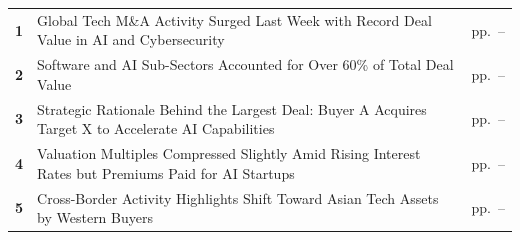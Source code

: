 \documentclass[10pt,a4paper]{article}
\begin{document}
\begin{tabularx}{\linewidth}{p{8mm}Yp{29mm}}
\textcolor{BOBlue}{\bfseries 1} & Global Tech M\&A Activity Surged Last Week with Record Deal Value in AI and Cybersecurity & {\color{BOMuted}pp.~\pageref{chap:1}--\pageref{chap:1:end}} \\[3pt]
\textcolor{BOBlue}{\bfseries 2} & Software and AI Sub-Sectors Accounted for Over 60\% of Total Deal Value & {\color{BOMuted}pp.~\pageref{chap:2}--\pageref{chap:2:end}} \\[3pt]
\textcolor{BOBlue}{\bfseries 3} & Strategic Rationale Behind the Largest Deal: Buyer A Acquires Target X to Accelerate AI Capabilities & {\color{BOMuted}pp.~\pageref{chap:3}--\pageref{chap:3:end}} \\[3pt]
\textcolor{BOBlue}{\bfseries 4} & Valuation Multiples Compressed Slightly Amid Rising Interest Rates but Premiums Paid for AI Startups & {\color{BOMuted}pp.~\pageref{chap:4}--\pageref{chap:4:end}} \\[3pt]
\textcolor{BOBlue}{\bfseries 5} & Cross-Border Activity Highlights Shift Toward Asian Tech Assets by Western Buyers & {\color{BOMuted}pp.~\pageref{chap:5}--\pageref{chap:5:end}} \\[3pt]
\end{tabularx}
\clearpage
\end{document}
